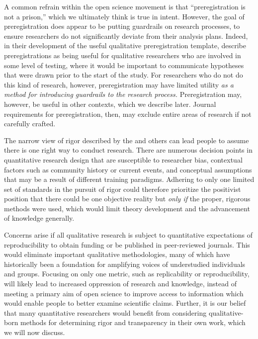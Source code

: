 \documentclass[authordate, meta, issue]{jote-new-article}
\begin{document}
A common refrain within the open science movement is that “preregistration is not a prison,” \parencites[e.g.,][]{DeHaven2017}{Mellor2021} which we ultimately think is true in intent. However, the goal of preregistration does appear to be putting guardrails on research processes, to ensure researchers do not significantly deviate from their analysis plans. Indeed, in their development of the useful qualitative preregistration template, \textcites{Haven2020} describe preregistrations as being useful for qualitative researchers who are involved in some level of testing, where it would be important to communicate hypotheses that were drawn prior to the start of the study. For researchers who do not do this kind of research, however, preregistration may have limited utility \emph{as a method for introducing guardrails to the research process.} Preregistration may, however, be useful in other contexts, which we describe later. Journal requirements for preregistration, then, may exclude entire areas of research if not carefully crafted.



The narrow view of rigor described by the \textcite{NIHND} and others can lead people to assume there is one right way to conduct research. There are numerous decision points in quantitative research design that are susceptible to researcher bias, contextual factors such as community history or current events, and conceptual assumptions that may be a result of different training paradigms. Adhering to only one limited set of standards in the pursuit of rigor could therefore prioritize the positivist position that there could be one objective reality but \emph{only if} the proper, rigorous methods were used, which would limit theory development and the advancement of knowledge generally.



Concerns arise if all qualitative research is subject to quantitative expectations of reproducibility to obtain funding or be published in peer-reviewed journals. This would eliminate important qualitative methodologies, many of which have historically been a foundation for amplifying voices of understudied individuals and groups. Focusing on only one metric, such as replicability or reproducibility, will likely lead to increased oppression of research and knowledge, instead of meeting a primary aim of open science to improve access to information which would enable people to better examine scientific claims. Further, it is our belief that many quantitative researchers would benefit from considering qualitative-born methods for determining rigor and transparency in their own work, which we will now discuss.
\end{document}
